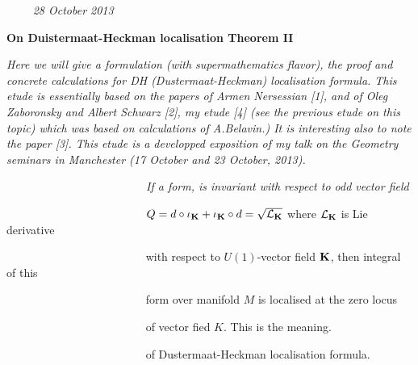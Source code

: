 
\def\vare {\varepsilon}
\def\A {{\bf A}}
\def\FF {{\bf F}}
\def\a {\alpha}
\def\K {{\bf K}}
\def\s {{\sigma}}
\def\p{\partial}
\def\vare{{\varepsilon}}
\def\L {{\cal L}}
\def\G {{\Gamma}}
\def\C {{\bf C}}
\def\Z {{\bf Z}}
\def\U  {{\cal U}}
\def\R  {{\bf R}}
\def\E  {{\bf E}}
\def\l {\lambda}
\def\degree {{\bf {\rm degree}\,\,}}
\def \finish {${\,\,\vrule height1mm depth2mm width 8pt}$}
\def \m {\medskip}
\def\r {{\bf r}}
\def\v {{\bf v}}
\def\n {{\bf n}}
\def\b {{\bf b}}
\def\ss  {{\bf s }}
\def\e{{\bf e}}
\def\ac {{\bf a}}
\def \X   {{\bf X}}
\def \Y   {{\bf Y}}
\def \x   {{\bf x}}
\def \y   {{\bf y}}
\def\w {{\omega}} 
\def\wv {{\buildrel \rightarrow\over \omega}}

\def\K{{\bf K}}
\def\locus {\hbox{locus of $\K$}}


$\qquad$ {\sl 28 October 2013}

\bigskip

\centerline {\bf On Duistermaat-Heckman localisation Theorem II}

\m

{\it
   Here we will give a formulation (with supermathematics flavor),
the proof and concrete calculations
for DH (Dustermaat-Heckman) localisation formula. This etude is essentially
based on the papers of Armen Nersessian [1], and
of  Oleg Zaboronsky and Albert Schwarz [2], my etude
[4] (see the previous etude on this topic) which was based on calculations 
of A.Belavin.) It is interesting also to note the paper [3].
This etude is a  developped exposition of my talk
on the Geometry seminars in Manchester
(17 October and 23 October, 2013).}


\m
      \medskip
{\sl
  $\qquad\qquad$$\qquad\qquad$$\qquad\qquad$ If a form, 
  is invariant with respect to odd vector field


$\qquad\qquad$$\qquad\qquad$$\qquad\qquad$  
  $Q=d\circ \iota_\K+\iota_\K\circ d=\sqrt {\L_\K}$ 
   where $\L_\K$ is Lie derivative 

$\qquad\qquad$$\qquad\qquad$$\qquad\qquad$ with respect
 to $U(1)$-vector field $\K$, then integral of this 

$\qquad\qquad$$\qquad\qquad$$\qquad\qquad$ form over manifold
  $M$ is localised at the zero locus 

$\qquad\qquad$$\qquad\qquad$$\qquad\qquad$ of vector fied $K$. This is the
 meaning.

$\qquad\qquad$$\qquad\qquad$$\qquad\qquad$ 
of Dustermaat-Heckman localisation formula.

}
 $$ $$



